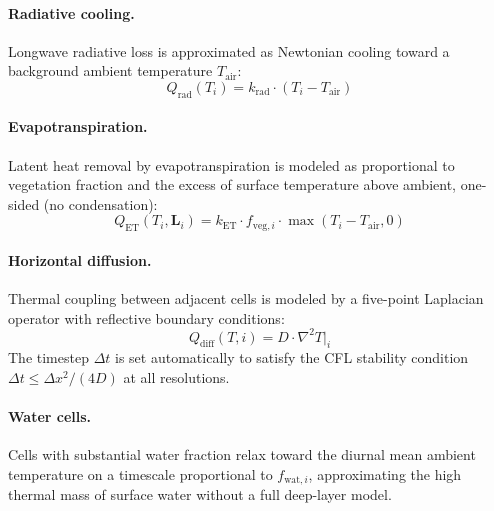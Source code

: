 \documentclass[12pt, letterpaper]{article}
\begin{document}
\paragraph{Radiative cooling.}
Longwave radiative loss is approximated as Newtonian cooling toward a
background ambient temperature $T_{\mathrm{air}}$:
\begin{equation}
  Q_{\mathrm{rad}}(T_i) = k_{\mathrm{rad}} \cdot (T_i - T_{\mathrm{air}})
\end{equation}

\paragraph{Evapotranspiration.}
Latent heat removal by evapotranspiration is modeled as proportional to
vegetation fraction and the excess of surface temperature above ambient,
one-sided (no condensation):
\begin{equation}
  Q_{\mathrm{ET}}(T_i, \mathbf{L}_i) =
  k_{\mathrm{ET}} \cdot f_{\mathrm{veg},i} \cdot
  \max(T_i - T_{\mathrm{air}}, 0)
\end{equation}

\paragraph{Horizontal diffusion.}
Thermal coupling between adjacent cells is modeled by a five-point Laplacian
operator with reflective boundary conditions:
\begin{equation}
  Q_{\mathrm{diff}}(T, i) = D \cdot \nabla^2 T \big|_i
\end{equation}
The timestep $\Delta t$ is set automatically to satisfy the CFL stability
condition $\Delta t \leq \Delta x^2 / (4D)$ at all resolutions.

\paragraph{Water cells.}
\label{par:water_methods}
Cells with substantial water fraction relax toward the diurnal mean ambient
temperature on a timescale proportional to $f_{\mathrm{wat},i}$, approximating
the high thermal mass of surface water without a full deep-layer model.
\end{document}
